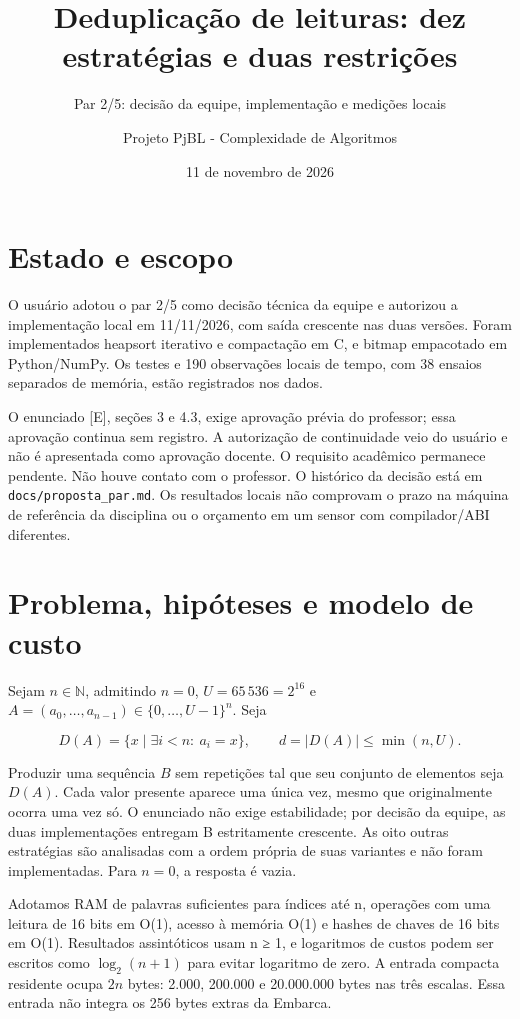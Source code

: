 \documentclass[
  brazilian,
  11pt,
  a4paper,
]{article}
\title{Deduplicação de leituras: dez estratégias e duas restrições}
\subtitle{Par 2/5: decisão da equipe, implementação e medições locais}
\author{Projeto PjBL - Complexidade de Algoritmos}
\date{11 de novembro de 2026}
\let\oldsection\section
\renewcommand{\section}{\Needspace{6\baselineskip}\oldsection}
\begin{document}
\maketitle

{
\setcounter{tocdepth}{1}
\tableofcontents
\clearpage
}
\section{Estado e escopo}\label{estado-e-escopo}

O usuário adotou o par 2/5 como decisão técnica da equipe e autorizou a
implementação local em 11/11/2026, com saída crescente nas duas versões.
Foram implementados heapsort iterativo e compactação em C, e bitmap
empacotado em Python/NumPy. Os testes e 190 observações locais de tempo,
com 38 ensaios separados de memória, estão registrados nos dados.

O enunciado {[}E{]}, seções 3 e 4.3, exige aprovação prévia do
professor; essa aprovação continua sem registro. A autorização de
continuidade veio do usuário e não é apresentada como aprovação docente.
O requisito acadêmico permanece pendente. Não houve contato com o
professor. O histórico da decisão está em
\texttt{docs/\allowbreak{}proposta\_\allowbreak{}par.\allowbreak{}md}.
Os resultados locais não comprovam o prazo na máquina de referência da
disciplina ou o orçamento em um sensor com compilador/ABI diferentes.

\section{Problema, hipóteses e modelo de
custo}\label{problema-hipuxf3teses-e-modelo-de-custo}

Sejam \(n\in\mathbb N\), admitindo \(n=0\), \(U=65\,536=2^{16}\) e
\(A=(a_0,\ldots,a_{n-1})\in\{0,\ldots,U-1\}^n\). Seja

\[D(A)=\{x\mid \exists i<n:\ a_i=x\},\qquad d=|D(A)|\le\min(n,U).\]

Produzir uma sequência \(B\) sem repetições tal que seu conjunto de
elementos seja \(D(A)\). Cada valor presente aparece uma única vez,
mesmo que originalmente ocorra uma vez só. O enunciado não exige
estabilidade; por decisão da equipe, as duas implementações entregam B
estritamente crescente. As oito outras estratégias são analisadas com a
ordem própria de suas variantes e não foram implementadas. Para \(n=0\),
a resposta é vazia.

Adotamos RAM de palavras suficientes para índices até n, operações com
uma leitura de 16 bits em O(1), acesso à memória O(1) e hashes de chaves
de 16 bits em O(1). Resultados assintóticos usam n ≥ 1, e logaritmos de
custos podem ser escritos como \(\log_2(n+1)\) para evitar logaritmo de
zero. A entrada compacta residente ocupa \(2n\) bytes: 2.000, 200.000 e
20.000.000 bytes nas três escalas. Essa entrada não integra os 256 bytes
extras da Embarca.
\end{document}
